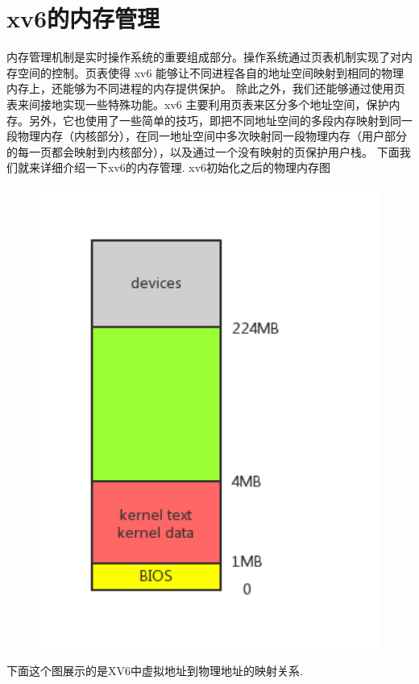 \documentclass[a4paper,12pt]{report}
\begin{document}
\section{xv6的内存管理}
内存管理机制是实时操作系统的重要组成部分。操作系统通过页表机制实现了对内存空间的控制。页表使得 xv6 能够让不同进程各自的地址空间映射到相同的物理内存上，还能够为不同进程的内存提供保护。 除此之外，我们还能够通过使用页表来间接地实现一些特殊功能。xv6 主要利用页表来区分多个地址空间，保护内存。另外，它也使用了一些简单的技巧，即把不同地址空间的多段内存映射到同一段物理内存（内核部分），在同一地址空间中多次映射同一段物理内存（用户部分的每一页都会映射到内核部分），以及通过一个没有映射的页保护用户栈。
下面我们就来详细介绍一下xv6的内存管理.
xv6初始化之后的物理内存图
\begin{figure}[H]
	\centering
	\includegraphics [width=1.0\textwidth]{figure//media//image1.png}
\end{figure}
下面这个图展示的是XV6中虚拟地址到物理地址的映射关系.
\end{document}
